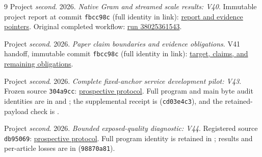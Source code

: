 \documentclass[10pt,twocolumn,letterpaper]{article}
\begin{document}
\begin{thebibliography}{9}
Project \emph{second}. 2026. \emph{Native Gram and streamed scale results: V40}.
Immutable project report at commit
\texttt{fbcc98c} (full identity in link):
\href{https://github.com/priyankjairaj100/second/blob/fbcc98c6559de4b88ffc9c8b960cf680d89e29d3/docs/NATIVE_SCALE_RESULTS_V40.md}{report and evidence pointers}.
Original completed workflow:
\href{https://github.com/priyankjairaj100/second/actions/runs/38025361543}{run 38025361543}.

Project \emph{second}. 2026. \emph{Paper claim boundaries and evidence obligations}.
V41 handoff, immutable commit
\texttt{fbcc98c} (full identity in link):
\href{https://github.com/priyankjairaj100/second/blob/fbcc98c6559de4b88ffc9c8b960cf680d89e29d3/docs/CLAIM_BOUNDARIES_V41.md}{target, claims, and remaining obligations}.

Project \emph{second}. 2026. \emph{Complete fixed-anchor service development
pilot: V43}. Frozen source \texttt{304a9cc}:
\href{https://github.com/priyankjairaj100/second/blob/304a9cc73b3c263032f3ef6a02487b4d2df40fbe/research_v43/PROTOCOL.txt}{prospective protocol}.
Full program and main byte audit identities are in
 and
;
the supplemental receipt is
(\texttt{cd03e4c3}), and the retained-payload check is
.

Project \emph{second}. 2026. \emph{Bounded exposed-quality diagnostic: V44}.
Registered source \texttt{db95069}:
\href{https://github.com/priyankjairaj100/second/blob/db95069b2c3484ac615052fb1c1a711c8c773c2d/research_v44/PROTOCOL.txt}{prospective protocol}.
Full program identity is retained in
; results and
per-article losses are in
(\texttt{98870a81}).
\end{thebibliography}
\end{document}
